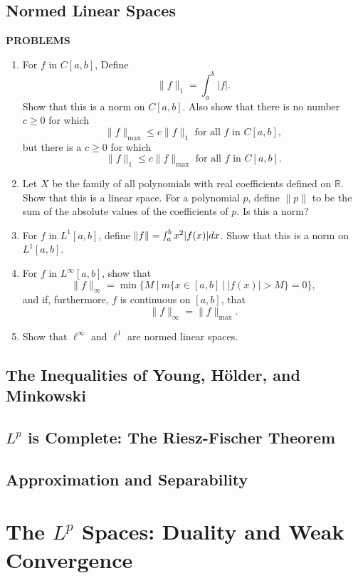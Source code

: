 \documentclass[a4paper,10pt]{book}
\theoremstyle{plain} %
\begin{document}
\section{Normed Linear Spaces}
\begin{center}
	\textbf{PROBLEMS}
\end{center}
\begin{enumerate}
	\setcounter{enumi}{0}
	\item For $f$ in $C[a,b]$, Define
	\[
	\| f \|_1 = \int_a^b |f|.	
	\]
	Show that this is a norm on $C[a,b]$.
	Also show that there is no number $c \ge 0$ for which
	\[
	\| f \|_{\max}	\le c \| f \|_1 \text{ for all $f$ in $C[a,b]$},
	\]
	but there is a $c \ge 0$ for which 
	\[
	\| f \|_1	\le c \| f \|_{\max} \text{ for all $f$ in $C[a,b]$}.
	\]
	\item Let $X$ be the family of all polynomials with real coefficients defined on $\mathbb{R}$.
	Show that this is a linear space. For a polynomial $p$, define $\| p\|$ to be the sum of the absolute values of the coefficients of $p$.
	Is this a norm?
	\item For $f$ in $L^1[a,b]$, define $\|f\| = \smallint_a^b x^2 |f(x)|dx$.
	Show that this is a norm on $L^1[a,b]$.
	\item For $f$ in $L^\infty[a,b]$, show that 
	\[
	\| f\|_\infty = \min \biggl \{ M \ \biggl |\ m \{x \in [a,b]\ |\ |f(x)| > M \} =0 \biggr \},
	\] 
	and if, furthermore, $f$ is continuous on $[a,b]$, that
	\[
	\| f \|_{\infty} = \| f \|_{\max}.	
	\]
	\item Show that $\ell^\infty$ and $\ell^1$ are normed linear spaces.
\end{enumerate}

\section{The Inequalities of Young, H\"older, and Minkowski}
\section{$L^p$ is Complete: The Riesz-Fischer Theorem}
\section{Approximation and Separability}

\chapter{The $L^p$ Spaces: Duality and Weak Convergence}
\end{document}
